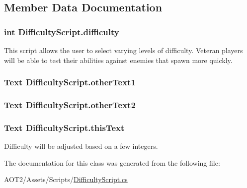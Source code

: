 \subsection{Member Data Documentation}
\hypertarget{class_difficulty_script_a1a931c1e4bc7c3465dc3e6a0bb4ac9d8}{}
\subsubsection[{difficulty}]{\setlength{\rightskip}{0pt plus 5cm}int Difficulty\+Script.\+difficulty\hspace{0.3cm}{\ttfamily [static]}}\label{class_difficulty_script_a1a931c1e4bc7c3465dc3e6a0bb4ac9d8}
This script allows the user to select varying levels of difficulty. Veteran players will be able to test their abilities against enemies that spawn more quickly. \hypertarget{class_difficulty_script_ac35d383f05d94d0388dae2aa9544aeec}{}
\subsubsection[{other\+Text1}]{\setlength{\rightskip}{0pt plus 5cm}Text Difficulty\+Script.\+other\+Text1}\label{class_difficulty_script_ac35d383f05d94d0388dae2aa9544aeec}
\hypertarget{class_difficulty_script_a88e0b2f1fdb864f25e32c7945467befa}{}
\subsubsection[{other\+Text2}]{\setlength{\rightskip}{0pt plus 5cm}Text Difficulty\+Script.\+other\+Text2}\label{class_difficulty_script_a88e0b2f1fdb864f25e32c7945467befa}
\hypertarget{class_difficulty_script_a6cf366e11e24688822b51ad02a591d12}{}
\subsubsection[{this\+Text}]{\setlength{\rightskip}{0pt plus 5cm}Text Difficulty\+Script.\+this\+Text}\label{class_difficulty_script_a6cf366e11e24688822b51ad02a591d12}


Difficulty will be adjusted based on a few integers. 



The documentation for this class was generated from the following file\+:\begin{DoxyCompactItemize}
\item 
A\+O\+T2/\+Assets/\+Scripts/\hyperlink{_difficulty_script_8cs}{Difficulty\+Script.\+cs}\end{DoxyCompactItemize}
